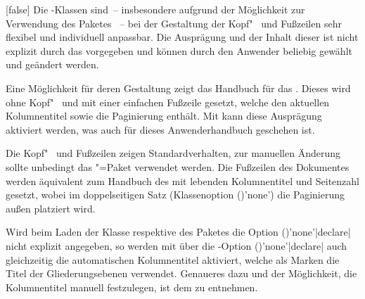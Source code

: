 \begin{Declaration*}{}
\begin{Declaration*}{}
\begin{Declaration*}{}
\begin{Declaration}[%
  v2.03!\Option{cdfoot=color}:farbiger Hintergrund der Fußzeile;%
  v2.03!\Option{cdfoot=\PValueName{Höhe}};%
]{}[false]
Die \TUDScript-Klassen sind~-- insbesondere aufgrund der Möglichkeit zur 
Verwendung des Paketes ~-- bei der Gestaltung der 
Kopf"~ und Fußzeilen sehr flexibel und individuell anpassbar. Die Ausprägung 
und der Inhalt dieser ist nicht explizit durch das \CD vorgegeben und können 
durch den Anwender beliebig gewählt und geändert werden. 

Eine Möglichkeit für deren Gestaltung zeigt das Handbuch für das \TUDCD. Dieses 
wird ohne Kopf"~ und mit einer einfachen Fußzeile gesetzt, welche den aktuellen 
Kolumnentitel sowie die Paginierung enthält. Mit  kann diese 
Ausprägung aktiviert werden, was auch für dieses Anwenderhandbuch geschehen ist.
%
\begin{values}{}
\itemfalse
  Die Kopf"~ und Fußzeilen zeigen Standardverhalten, zur manuellen Änderung 
  sollte unbedingt das \KOMAScript"=Paket  verwendet 
  werden.
\itemtrue*
  Die Fußzeilen des Dokumentes werden äquivalent zum Handbuch des \TUDCDs mit 
  lebenden Kolumnentitel und Seitenzahl gesetzt, wobei im doppelseitigen Satz 
  (Klassenoption ()'none') die 
  Paginierung außen platziert wird.
\end{values}
%
Wird beim Laden der Klasse respektive des Paketes  
die Option ()'none'|declare| nicht 
explizit angegeben, so werden mit  über die 
\KOMAScript-Option ()'none'|declare| 
auch gleichzeitig die automatischen Kolumnentitel aktiviert, welche als Marken 
die Titel der Gliederungsebenen verwendet. Genaueres dazu und der Möglichkeit, 
die Kolumnentitel manuell festzulegen, ist dem \scrguide zu entnehmen.


\end{Declaration}
\end{Declaration*}
\end{Declaration*}
\end{Declaration*}
